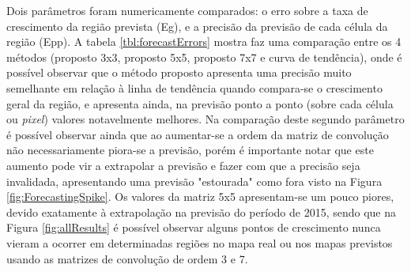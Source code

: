 Dois parâmetros foram numericamente comparados: o erro sobre a taxa de crescimento da região prevista (Eg), e a precisão da previsão de cada célula da região (Epp). A tabela \ref{tbl:forecastErrors} mostra faz uma comparação entre os 4 métodos (proposto 3x3, proposto 5x5, proposto 7x7 e curva de tendência), onde é possível observar que o método proposto apresenta uma precisão muito semelhante em relação à linha de tendência quando compara-se o crescimento geral da região, e apresenta ainda, na previsão ponto a ponto (sobre cada célula ou \emph{pixel}) valores notavelmente melhores. Na comparação deste segundo parâmetro é possível observar ainda que ao aumentar-se a ordem da matriz de convolução não necessariamente piora-se a previsão, porém é importante notar que este aumento pode vir a extrapolar a previsão e fazer com que a precisão seja invalidada, apresentando uma previsão "estourada" como fora visto na Figura \ref{fig:ForecastingSpike}. Os valores da matriz 5x5 apresentam-se um pouco piores, devido exatamente à extrapolação na previsão do período de 2015, sendo que na Figura \ref{fig:allResults} é possível observar alguns pontos de crescimento nunca vieram a ocorrer em determinadas regiões no mapa real ou nos mapas previstos usando as matrizes de convolução de ordem 3 e 7. 

